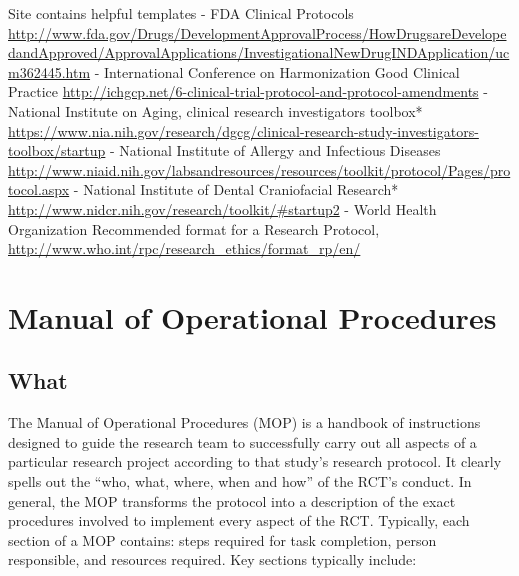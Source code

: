\documentclass[]{book}
\begin{document}
Site contains helpful templates - FDA Clinical Protocols
\url{http://www.fda.gov/Drugs/DevelopmentApprovalProcess/HowDrugsareDevelopedandApproved/ApprovalApplications/InvestigationalNewDrugINDApplication/ucm362445.htm}
- International Conference on Harmonization Good Clinical Practice
\url{http://ichgcp.net/6-clinical-trial-protocol-and-protocol-amendments}
- National Institute on Aging, clinical research investigators toolbox*
\url{https://www.nia.nih.gov/research/dgcg/clinical-research-study-investigators-toolbox/startup}
- National Institute of Allergy and Infectious Diseases
\url{http://www.niaid.nih.gov/labsandresources/resources/toolkit/protocol/Pages/protocol.aspx}
- National Institute of Dental Craniofacial Research*
\url{http://www.nidcr.nih.gov/research/toolkit/\#startup2} - World
Health Organization Recommended format for a Research Protocol,
\url{http://www.who.int/rpc/research_ethics/format_rp/en/}

\section{Manual of Operational
Procedures}\label{manual-of-operational-procedures}

\subsection{What}\label{what-12}

The Manual of Operational Procedures (MOP) is a handbook of instructions
designed to guide the research team to successfully carry out all
aspects of a particular research project according to that study's
research protocol. It clearly spells out the ``who, what, where, when
and how'' of the RCT's conduct. In general, the MOP transforms the
protocol into a description of the exact procedures involved to
implement every aspect of the RCT. Typically, each section of a MOP
contains: steps required for task completion, person responsible, and
resources required. Key sections typically include:
\end{document}
